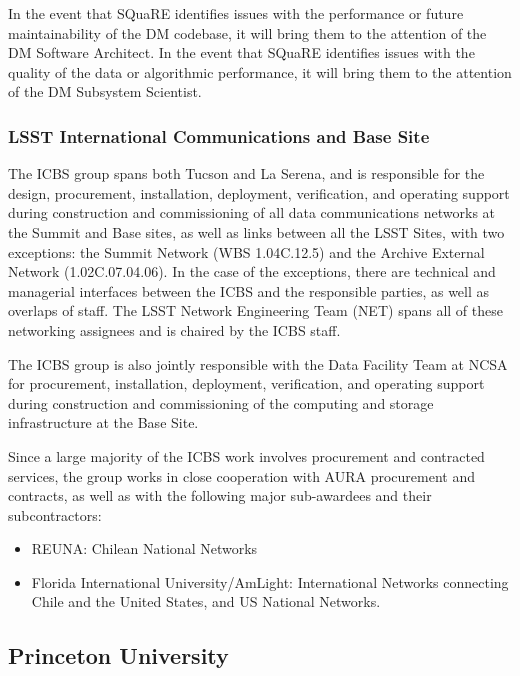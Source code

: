 In the event that \gls{SQuaRE} identifies issues with the performance or future maintainability of the \gls{DM} codebase, it will bring them to the attention of the \gls{DM} Software Architect. In the event that \gls{SQuaRE} identifies issues with the quality of the data or algorithmic performance, it will bring them to the attention of the \gls{DM} \gls{Subsystem Scientist}.

\subsubsection{LSST International Communications and Base Site}
The \gls{ICBS} group spans both Tucson and La Serena, and is responsible for the design, procurement, installation, deployment, verification, and operating support during construction and commissioning of all data communications networks at the \gls{Summit} and Base sites, as well as links between all the \gls{LSST} Sites, with two exceptions:  the \gls{Summit} Network (\gls{WBS} 1.04C.12.5) and the \gls{Archive} External Network (1.02C.07.04.06).  In the case of the exceptions, there are technical and managerial interfaces between the \gls{ICBS} and the responsible parties, as well as overlaps of staff.  The \gls{LSST} Network Engineering Team (\gls{NET}) spans all of these networking assignees and is chaired by the \gls{ICBS} staff.

The \gls{ICBS} group is also jointly responsible with the Data Facility Team at \gls{NCSA} for procurement, installation, deployment, verification, and operating support during construction and commissioning of the computing and storage infrastructure at the Base Site.

Since a large majority of the \gls{ICBS} work involves procurement and contracted services, the group works in close cooperation with \gls{AURA} procurement and contracts, as well as with the following major sub-awardees and their subcontractors:

\begin{itemize}
	\item \gls{REUNA}: Chilean National Networks
	\item Florida International University/AmLight: International Networks connecting Chile and the United States, and \gls{US} National Networks.
\end{itemize}

\subsection {Princeton University \label{sect:princeton}}


